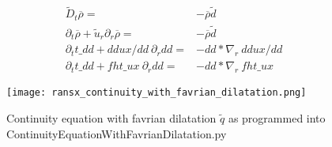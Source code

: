 \documentclass[11pt,paper=a4]{report}
\newcommand{\eht}{\overline}
\newcommand{\fht}{\widetilde}
\begin{document}
\begin{table}[!h]
\label{tab:rans-xtrans}
\begin{align}
  \fht{D}_t \eht{\rho} = & -\eht{\rho}\fht{d} \\
  \partial_t \eht{\rho} + \fht{u}_r \partial_r \eht{\rho} = & -\eht{\rho}\fht{d} \nonumber \\
  \partial_t t\_dd + ddux/dd \ \partial_r dd = & -dd * \nabla_r \ ddux/dd \nonumber \\
  \partial_t t\_dd + fht\_ux \ \partial_r dd = & -dd * \nabla_r \ fht\_ux \nonumber   
\end{align}
\end{table}

\begin{figure}[!h]
\centerline{
\texttt{[image: ransx\_continuity\_with\_favrian\_dilatation.png]}}
\caption{Continuity equation with favrian dilatation $\fht{q}$ as programmed into ContinuityEquationWithFavrianDilatation.py}
\label{fig:cont_dil}
\end{figure}








\end{document}
